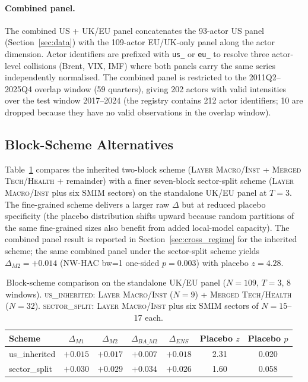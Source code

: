 \documentclass[11pt,a4paper]{article}
\begin{document}
\paragraph{Combined panel.} The combined US + UK/EU panel concatenates the 93-actor US panel (Section~\ref{sec:data}) with the 109-actor EU/UK-only panel along the actor dimension. Actor identifiers are prefixed with \texttt{us\_} or \texttt{eu\_} to resolve three actor-level collisions (Brent, VIX, IMF) where both panels carry the same series independently normalised. The combined panel is restricted to the 2011Q2--2025Q4 overlap window (59 quarters), giving 202 actors with valid intensities over the test window 2017--2024 (the registry contains 212 actor identifiers; 10 are dropped because they have no valid observations in the overlap window).

\subsection{Block-Scheme Alternatives}

Table~\ref{tab:uk_eu_blocks_alt} compares the inherited two-block scheme (\textsc{Layer Macro/Inst} + \textsc{Merged Tech/Health} + remainder) with a finer seven-block sector-split scheme (\textsc{Layer Macro/Inst} plus six SMIM sectors) on the standalone UK/EU panel at $T=3$. The fine-grained scheme delivers a larger raw $\Delta$ but at reduced placebo specificity (the placebo distribution shifts upward because random partitions of the same fine-grained sizes also benefit from added local-model capacity). The combined panel result is reported in Section~\ref{sec:cross_regime} for the inherited scheme; the same combined panel under the sector-split scheme yields $\Delta_{M2} = +0.014$ (NW-HAC bw=1 one-sided $p = 0.003$) with placebo $z = 4.28$.

\begin{table}[H]
\centering
\caption{Block-scheme comparison on the standalone UK/EU panel ($N=109$, $T=3$, 8 windows). \textsc{us\_inherited}: \textsc{Layer Macro/Inst} ($N{=}9$) + \textsc{Merged Tech/Health} ($N{=}32$). \textsc{sector\_split}: \textsc{Layer Macro/Inst} plus six SMIM sectors of $N{=}15$--17 each.}
\label{tab:uk_eu_blocks_alt}
\small
\begin{tabular}{lcccccc}
\toprule
Scheme & $\Delta_{M1}$ & $\Delta_{M2}$ & $\Delta_{BA\_M2}$ & $\Delta_{ENS}$ & Placebo $z$ & Placebo $p$ \\
\midrule
us\_inherited & $+0.015$ & $+0.017$ & $+0.007$ & $+0.018$ & 2.31 & 0.020 \\
sector\_split & $+0.030$ & $+0.029$ & $+0.034$ & $+0.026$ & 1.60 & 0.058 \\
\bottomrule
\end{tabular}
\end{table}
\end{document}
